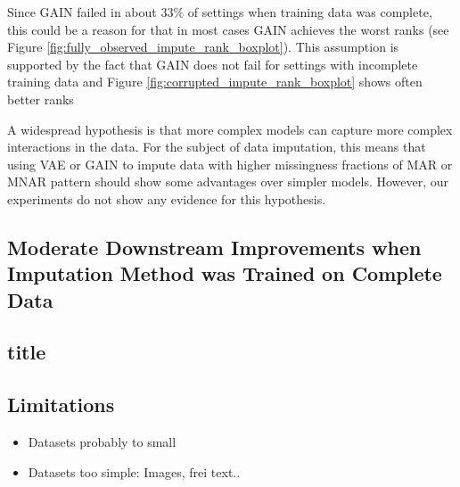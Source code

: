 Since GAIN failed in about $33\%$ of settings when training data was complete, this could be a reason for that in most cases GAIN achieves the worst ranks (see Figure \ref{fig:fully_observed_impute_rank_boxplot}). This assumption is supported by the fact that GAIN does not fail for settings with incomplete training data and Figure \ref{fig:corrupted_impute_rank_boxplot} shows often better ranks

A widespread hypothesis is that more complex models can capture more complex interactions in the data. For the subject of data imputation, this means that using VAE or GAIN to impute data with higher missingness fractions of MAR or MNAR pattern should show some advantages over simpler models. However, our experiments do not show any evidence for this hypothesis.



\subsection{Moderate Downstream Improvements when Imputation Method was Trained on Complete Data}
%


\subsection{title}


\subsection{Limitations}
%

\begin{itemize}
	\item Datasets probably to small
	\item Datasets too simple: Images, frei text..
\end{itemize}
